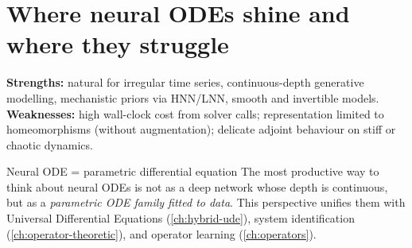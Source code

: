 \section{Where neural ODEs shine and where they struggle}
\textbf{Strengths:} natural for irregular time series, continuous-depth
generative modelling, mechanistic priors via HNN/LNN, smooth and
invertible models.\\
\textbf{Weaknesses:} high wall-clock cost from solver calls;
representation limited to homeomorphisms (without augmentation);
delicate adjoint behaviour on stiff or chaotic dynamics.

\begin{insight}{Neural ODE = parametric differential equation}
The most productive way to think about neural ODEs is not as a deep
network whose depth is continuous, but as a \emph{parametric ODE family
fitted to data}. This perspective unifies them with Universal
Differential Equations (\cref{ch:hybrid-ude}), system identification
(\cref{ch:operator-theoretic}), and operator learning
(\cref{ch:operators}).
\end{insight}
